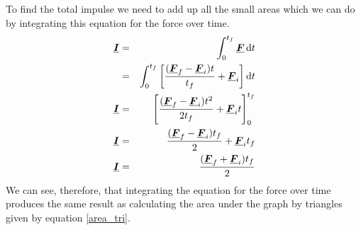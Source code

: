 \noindent To find the total impulse we need to add up all the small areas which we can do by integrating this equation for the force over time.
\begin{eqnarray}
{\vtr I}&=&\int_0^{t_f}{{\vtr F} \d t}\nonumber \\
&=&\int_0^{t_f}\left[\frac{({\vtr F_f}-{\vtr F_i})t}{t_f}+{\vtr F_i}\right] \d t\nonumber\\
{\vtr I}&=&\left[\frac{({\vtr F_f}-{\vtr F_i})t^2}{2t_f}+{\vtr F_i}t\right]_0^{t_f}\nonumber\\
{\vtr I}&=&\frac{({\vtr F_f}-{\vtr F_i})t_f}{2}+{\vtr F_i}t_f\nonumber\\
{\vtr I}&=&\frac{({\vtr F_f}+{\vtr F_i})t_f}{2}
\end{eqnarray}
We can see, therefore, that integrating the equation for the force over time produces the same result as calculating the area under the graph by triangles given by equation \ref{area_tri}.

